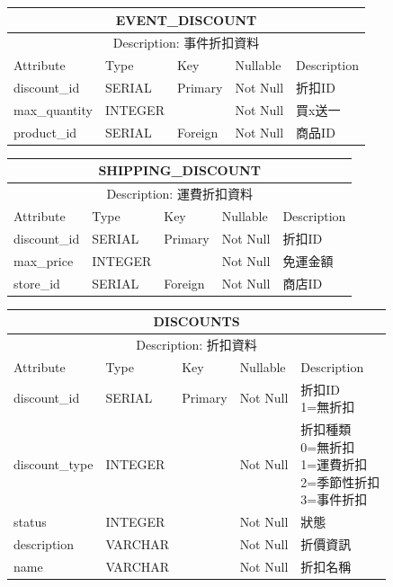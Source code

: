 \documentclass[a4paper, 12pt]{article}
\begin{document}
\vspace{1em}
\noindent\begin{tabular}{ | p{7em} | p{5.5em} | p{5.5em} | p{4.5em} | p{11em} |}
  \hline
  \multicolumn{5}{|c|}{EVENT_DISCOUNT} \tabularnewline
  \hline 
  \multicolumn{5}{|c|}{Description: 事件折扣資料} \tabularnewline
  \hline 
  Attribute & Type & Key & Nullable & Description \\
  \hline
  discount_id & SERIAL & Primary & Not Null & 折扣ID \\
  \hline
  max_quantity & INTEGER & &Not Null &買x送一\\
  \hline
  product_id & SERIAL & Foreign &Not Null &商品ID\\
  \hline
\end{tabular}
\vspace{1em}

\noindent\begin{tabular}{ | p{7em} | p{5.5em} | p{5.5em} | p{4.5em} | p{11em} |}
  \hline
  \multicolumn{5}{|c|}{SHIPPING_DISCOUNT} \tabularnewline
  \hline 
  \multicolumn{5}{|c|}{Description: 運費折扣資料} \tabularnewline
  \hline 
  Attribute & Type & Key & Nullable & Description \\
  \hline
  discount_id & SERIAL & Primary & Not Null & 折扣ID \\
  \hline
  max_price & INTEGER & &Not Null &免運金額\\
  \hline
  store_id & SERIAL & Foreign &Not Null &商店ID\\
  \hline
\end{tabular}
\vspace{1em}

\noindent\begin{tabular}{ | p{7em} | p{5.5em} | p{5.5em} | p{4.5em} | p{11em} |}
  \hline
  \multicolumn{5}{|c|}{DISCOUNTS} \tabularnewline
  \hline 
  \multicolumn{5}{|c|}{Description: 折扣資料} \tabularnewline
  \hline 
  Attribute & Type & Key & Nullable & Description \\
  \hline
  discount_id & SERIAL & Primary & Not Null & \makecell[l]{折扣ID\\1=無折扣} \\
  \hline
  discount_type & INTEGER &  & Not Null & \makecell[l]{折扣種類\\0=無折扣\\1=運費折扣\\2=季節性折扣\\3=事件折扣} \\
  \hline
  status & INTEGER & &Not Null &狀態\\
  \hline
  description& VARCHAR &  &Not Null &折價資訊\\
  \hline
  name & VARCHAR &  &Not Null &折扣名稱\\
  \hline
\end{tabular}
\vspace{1em}
\end{document}
